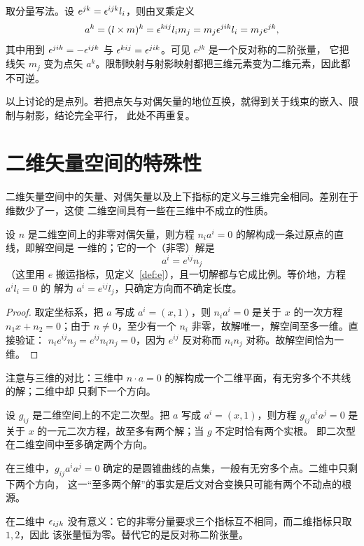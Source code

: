 取分量写法。设 $e^{jk}=\epsilon^{ijk}l_i$，则由叉乘定义
\[
a^k=(l\times m)^k=\epsilon^{kij}l_im_j=m_j\epsilon^{jik}l_i=m_je^{jk},
\]
其中用到 $\epsilon^{jik}=-\epsilon^{ijk}$ 与 $\epsilon^{kij}=\epsilon^{jik}$。可见 $e^{jk}$ 是一个反对称的二阶张量，
它把线矢 $m_j$ 变为点矢 $a^k$。限制映射与射影映射都把三维元素变为二维元素，因此都不可逆。

以上讨论的是点列。若把点矢与对偶矢量的地位互换，就得到关于线束的嵌入、限制与射影，结论完全平行，
此处不再重复。

\section{二维矢量空间的特殊性}

二维矢量空间中的矢量、对偶矢量以及上下指标的定义与三维完全相同。差别在于维数少了一，这使
二维空间具有一些在三维中不成立的性质。

\begin{proposition}\label{prop:2d-unique}
设 $n$ 是二维空间上的非零对偶矢量，则方程 $n_ia^i=0$ 的解构成一条过原点的直线，即解空间是
一维的；它的一个（非零）解是
\[
a^i=e^{ij}n_j
\]
（这里用 $e$ 搬运指标，见定义~\ref{def:e}），且一切解都与它成比例。等价地，方程 $a^il_i=0$ 的
解为 $a^i=e^{ij}l_j$，只确定方向而不确定长度。
\end{proposition}

\begin{proof}
取定坐标系，把 $a$ 写成 $a^i=(x,1)$，则 $n_ia^i=0$ 是关于 $x$ 的一次方程
$n_1x+n_2=0$；由于 $n\ne 0$，至少有一个 $n_i$ 非零，故解唯一，解空间至多一维。直接验证：
$n_ie^{ij}n_j=e^{ij}n_in_j=0$，因为 $e^{ij}$ 反对称而 $n_in_j$ 对称。故解空间恰为一维。
\end{proof}

注意与三维的对比：三维中 $n\cdot a=0$ 的解构成一个二维平面，有无穷多个不共线的解；二维中却
只剩下一个方向。

\begin{proposition}\label{prop:2d-conic}
设 $g_{ij}$ 是二维空间上的不定二次型。把 $a$ 写成 $a^i=(x,1)$，则方程
$g_{ij}a^ia^j=0$ 是关于 $x$ 的一元二次方程，故至多有两个解；当 $g$ 不定时恰有两个实根。
即二次型在二维空间中至多确定两个方向。
\end{proposition}

在三维中，$g_{ij}a^ia^j=0$ 确定的是圆锥曲线的点集，一般有无穷多个点。二维中只剩下两个方向，
这一“至多两个解”的事实是后文对合变换只可能有两个不动点的根源。

在二维中 $\epsilon_{ijk}$ 没有意义：它的非零分量要求三个指标互不相同，而二维指标只取 $1,2$，因此
该张量恒为零。替代它的是反对称二阶张量。

